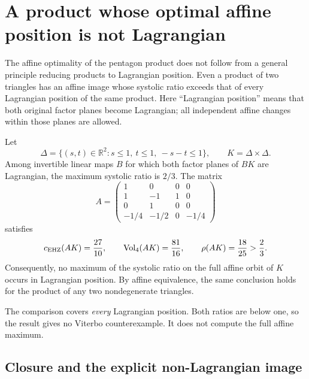\section{A product whose optimal affine position is not Lagrangian}
\label{sec:nonlagrangian-product}

The affine optimality of the pentagon product does not follow from a general
principle reducing products to Lagrangian position. Even a product of two
triangles has an affine image whose systolic ratio exceeds that of every
Lagrangian position of the same product. Here ``Lagrangian position'' means
that both original factor planes become Lagrangian; all independent affine
changes within those planes are allowed.

\begin{theorem}\label{thm:nonlagrangian-triangles}
Let
\[
 \Delta=\{(s,t)\in\mathbb R^2:s\leq1,\ t\leq1,\ -s-t\leq1\},
 \qquad K=\Delta\times\Delta.
\]
Among invertible linear maps $B$ for which both factor planes of $BK$
are Lagrangian, the maximum systolic ratio is $2/3$. The matrix
\[
 A=\begin{pmatrix}
 1&0&0&0\\
 1&-1&1&0\\
 0&1&0&0\\
 -1/4&-1/2&0&-1/4
 \end{pmatrix}
\]
satisfies
\[
 c_{\mathrm{EHZ}}(AK)=\frac{27}{10},\qquad
 \operatorname{Vol}_4(AK)=\frac{81}{16},\qquad
 \rho(AK)=\frac{18}{25}>\frac23.
\]
Consequently, no maximum of the systolic ratio on the full affine orbit
of $K$ occurs in Lagrangian position. By affine equivalence, the same
conclusion holds for the product of any two nondegenerate triangles.
\end{theorem}

The comparison covers \emph{every} Lagrangian position. Both ratios are below
one, so the result gives no Viterbo counterexample. It does not compute the
full affine maximum.

\subsection{Closure and the explicit non-Lagrangian image}

